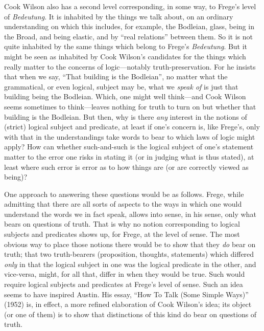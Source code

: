 Cook Wilson also has a second level corresponding, in some way, to Frege's level of \emph{Bedeutung}. It is inhabited by the things we talk about, on an ordinary understanding on which this includes, for example, the Bodleian, glass, being in the Broad, and being elastic, and by ``real relations'' between them. So it is not quite inhabited by the same things which belong to Frege's \emph{Bedeutung}. But it might be seen as inhabited by Cook Wilson’s candidates for the things which really matter to the concerns of logic---notably truth-preservation. For he insists that when we say, ``That building is the Bodleian'', no matter what the grammatical, or even logical, subject may be, what we \emph{speak of} is just that building being the Bodleian. Which, one might well think---and Cook Wilson seems sometimes to think---leaves nothing for truth to turn on but whether that building is the Bodleian. But then, why is there \emph{any} interest in the notions of (strict) logical subject and predicate, at least if one’s concern is, like Frege’s, only with that in the understandings take words to bear to which laws of logic might apply? How can whether such-and-such is the logical subject of one’s statement matter to the error one risks in stating it (or in judging what is thus stated), at least where such error is error as to how things are (or are correctly viewed as being)?

One approach to answering these questions would be as follows. Frege, while admitting that there are all sorts of aspects to the ways in which one would understand the words we in fact speak, allows into sense, in his sense, only what bears on questions of truth. That is why no notion corresponding to logical subjects and predicates shows up, for Frege, at the level of sense. The most obvious way to place those notions there would be to show that they \emph{do} bear on truth; that two truth-bearers (proposition, thoughts, statements) which differed \emph{only} in that the logical subject in one was the logical predicate in the other, and vice-versa, might, for all that, differ in when they would be true. Such would require logical subjects and predicates at Frege's level of sense. Such an idea seems to have inspired Austin. His essay, ``How To Talk (Some Simple Ways)'' (1952) is, in effect, a more refined elaboration of Cook Wilson's idea; its object (or one of them) is to show that distinctions of this kind do bear on questions of truth.

